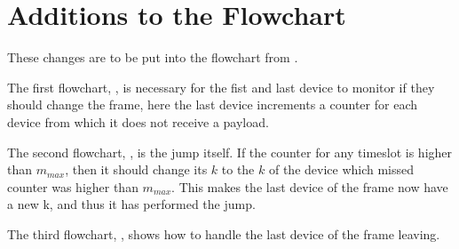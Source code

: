 \section{Additions to the Flowchart}
These changes are to be put into the flowchart from .



The first flowchart, , is necessary for the fist and last device to monitor if they should change the frame, here the last device increments a counter for each device from which it does not receive a payload.


The second flowchart, , is the jump itself.
If the counter for any timeslot is higher than $m_{max}$, then it should change its $k$ to the $k$ of the device which missed counter was higher than $m_{max}$.
This makes the last device of the frame now have a new k, and thus it has performed the jump.	

The third flowchart, , shows how to handle the last device of the frame leaving.

